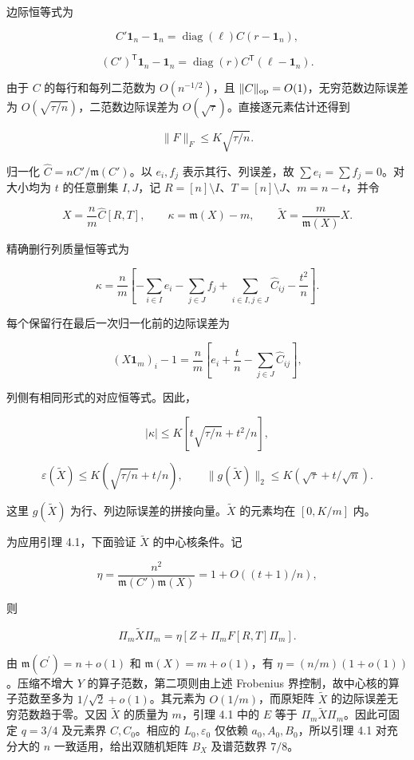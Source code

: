 \documentclass[11pt,a4paper]{article}
\begin{document}
边际恒等式为

\[
C'\mathbf 1_n-\mathbf 1_n=\operatorname{diag}(\ell)C(r-\mathbf 1_n),
\]

\[
(C')^{\mathsf T}\mathbf 1_n-\mathbf 1_n=\operatorname{diag}(r)C^{\mathsf T}(\ell-\mathbf 1_n).
\]

由于 \(C\) 的每行和每列二范数为 \(O(n^{-1/2})\)，且 \(\|C\|_{\rm op}=O(1)\)，无穷范数边际误差为 \(O(\sqrt{\tau/n})\)，二范数边际误差为 \(O(\sqrt\tau)\)。直接逐元素估计还得到

\[
\|F\|_F\le K\sqrt{\tau/n}.
\]

归一化 \(\widehat C=nC'/\mathfrak m(C')\)。以 \(e_i,f_j\) 表示其行、列误差，故 \(\sum e_i=\sum f_j=0\)。对大小均为 \(t\) 的任意删集 \(I,J\)，记 \(R=[n]\setminus I\)、\(T=[n]\setminus J\)、\(m=n-t\)，并令

\[
X=\frac n m\widehat C[R,T],\qquad \kappa=\mathfrak m(X)-m,\qquad \widetilde X=\frac m{\mathfrak m(X)}X.
\]

精确删行列质量恒等式为

\begin{equation}
\kappa=\frac n m\left[-\sum_{i\in I}e_i-\sum_{j\in J}f_j+\sum_{i\in I,j\in J}\widehat C_{ij}-\frac{t^2}{n}\right].
\tag{4.1}
\label{eq-deletion-mass}
\end{equation}

每个保留行在最后一次归一化前的边际误差为

\[
(X\mathbf 1_m)_i-1=\frac n m\left[e_i+\frac t n-\sum_{j\in J}\widehat C_{ij}\right],
\]

列侧有相同形式的对应恒等式。因此，

\[
|\kappa|\le K\left[t\sqrt{\tau/n}+t^2/n\right],
\]

\[
\varepsilon(\widetilde X)\le K(\sqrt{\tau/n}+t/n),\qquad \|g(\widetilde X)\|_2\le K(\sqrt\tau+t/\sqrt n).
\]

这里 \(g(\widetilde X)\) 为行、列边际误差的拼接向量。\(\widetilde X\) 的元素均在 \([0,K/m]\) 内。

为应用引理 4.1，下面验证 \(\widetilde X\) 的中心核条件。记

\[
\eta=\frac{n^2}{\mathfrak m(C')\mathfrak m(X)}=1+O((t+1)/n),
\]

则

\[
\Pi_m\widetilde X\Pi_m=\eta\left[Z+\Pi_mF[R,T]\Pi_m\right].
\]

由 \(\mathfrak m(C^{\prime})=n+o(1)\) 和 \(\mathfrak m(X)=m+o(1)\)，有 \(\eta=(n/m)(1+o(1))\)。压缩不增大 \(Y\) 的算子范数，第二项则由上述 Frobenius 界控制，故中心核的算子范数至多为 \(1/\sqrt2+o(1)\)。其元素为 \(O(1/m)\)，而原矩阵 \(\widetilde X\) 的边际误差无穷范数趋于零。又因 \(\widetilde X\) 的质量为 \(m\)，引理 4.1 中的 \(E\) 等于 \(\Pi_m\widetilde X\Pi_m\)。因此可固定 \(q=3/4\) 及元素界 \(C,C_0\)。相应的 \(L_0,\varepsilon_0\) 仅依赖 \(a_0,A_0,B_0\)，所以引理 4.1 对充分大的 \(n\) 一致适用，给出双随机矩阵 \(B_X\) 及谱范数界 \(7/8\)。
\end{document}
